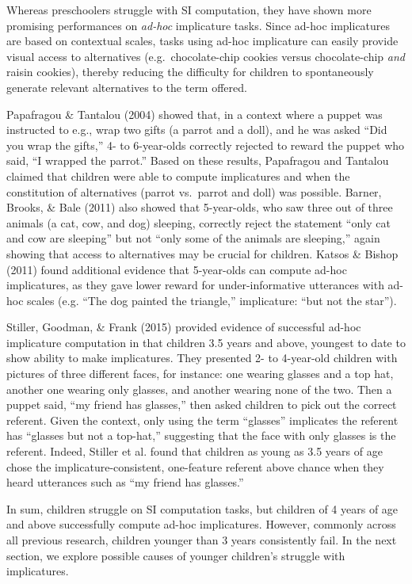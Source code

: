 \documentclass[a4paper,man,apacite,floatsintext]{apa6}
\begin{document}
Whereas preschoolers struggle with SI computation, they have shown more
promising performances on \emph{ad-hoc} implicature tasks. Since ad-hoc
implicatures are based on contextual scales, tasks using ad-hoc
implicature can easily provide visual access to alternatives
(e.g.~chocolate-chip cookies versus chocolate-chip \emph{and} raisin
cookies), thereby reducing the difficulty for children to spontaneously
generate relevant alternatives to the term offered.

Papafragou \& Tantalou (2004) showed that, in a context where a puppet
was instructed to e.g., wrap two gifts (a parrot and a doll), and he was
asked ``Did you wrap the gifts,'' 4- to 6-year-olds correctly rejected
to reward the puppet who said, ``I wrapped the parrot.'' Based on these
results, Papafragou and Tantalou claimed that children were able to
compute implicatures and when the constitution of alternatives (parrot
vs.~parrot and doll) was possible. Barner, Brooks, \& Bale (2011) also
showed that 5-year-olds, who saw three out of three animals (a cat, cow,
and dog) sleeping, correctly reject the statement ``only cat and cow are
sleeping'' but not ``only some of the animals are sleeping,'' again
showing that access to alternatives may be crucial for children. Katsos
\& Bishop (2011) found additional evidence that 5-year-olds can compute
ad-hoc implicatures, as they gave lower reward for under-informative
utterances with ad-hoc scales (e.g. ``The dog painted the triangle,''
implicature: ``but not the star'').

Stiller, Goodman, \& Frank (2015) provided evidence of successful ad-hoc
implicature computation in that children 3.5 years and above, youngest
to date to show ability to make implicatures. They presented 2- to
4-year-old children with pictures of three different faces, for
instance: one wearing glasses and a top hat, another one wearing only
glasses, and another wearing none of the two. Then a puppet said, ``my
friend has glasses,'' then asked children to pick out the correct
referent. Given the context, only using the term ``glasses'' implicates
the referent has ``glasses but not a top-hat,'' suggesting that the face
with only glasses is the referent. Indeed, Stiller et al. found that
children as young as 3.5 years of age chose the implicature-consistent,
one-feature referent above chance when they heard utterances such as
``my friend has glasses.''

In sum, children struggle on SI computation tasks, but children of 4
years of age and above successfully compute ad-hoc implicatures.
However, commonly across all previous research, children younger than 3
years consistently fail. In the next section, we explore possible causes
of younger children's struggle with implicatures.
\end{document}
